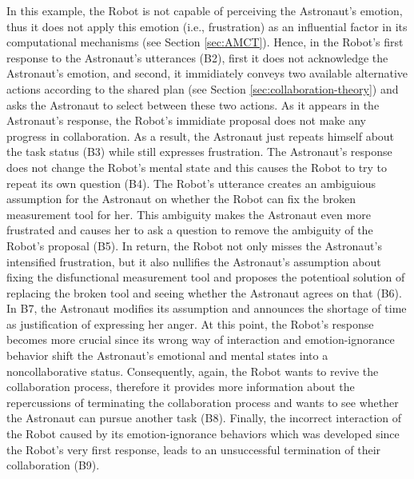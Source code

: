 In this example, the Robot is not capable of perceiving the Astronaut's emotion,
thus it does not apply this emotion (i.e., frustration) as an influential factor
in its computational mechanisms (see Section \ref{sec:AMCT}). Hence, in the
Robot's first response to the Astronaut's utterances (B2), first it does not
acknowledge the Astronaut's emotion, and second, it immidiately conveys two
available alternative actions according to the shared plan (see Section
\ref{sec:collaboration-theory}) and asks the Astronaut to select between these
two actions. As it appears in the Astronaut's response, the Robot's immidiate
proposal does not make any progress in collaboration. As a result, the Astronaut
just repeats himself about the task status (B3) while still expresses
frustration. The Astronaut's response does not change the Robot's mental state
and this causes the Robot to try to repeat its own question (B4). The Robot's
utterance creates an ambiguious assumption for the Astronaut on whether the
Robot can fix the broken measurement tool for her. This ambiguity makes the
Astronaut even more frustrated and causes her to ask a question to remove the
ambiguity of the Robot's proposal (B5). In return, the Robot not only misses the
Astronaut's intensified frustration, but it also nullifies the Astronaut's
assumption about fixing the disfunctional measurement tool and proposes the
potentioal solution of replacing the broken tool and seeing whether the
Astronaut agrees on that (B6). In B7, the Astronaut modifies its assumption and
announces the shortage of time as justification of expressing her anger. At this
point, the Robot's response becomes more crucial since its wrong way of
interaction and emotion-ignorance behavior shift the Astronaut's emotional and
mental states into a noncollaborative status. Consequently, again, the Robot
wants to revive the collaboration process, therefore it provides more
information about the repercussions of terminating the collaboration process and
wants to see whether the Astronaut can pursue another task (B8). Finally, the
incorrect interaction of the Robot caused by its emotion-ignorance behaviors
which was developed since the Robot's very first response, leads to an
unsuccessful termination of their collaboration (B9).\\


